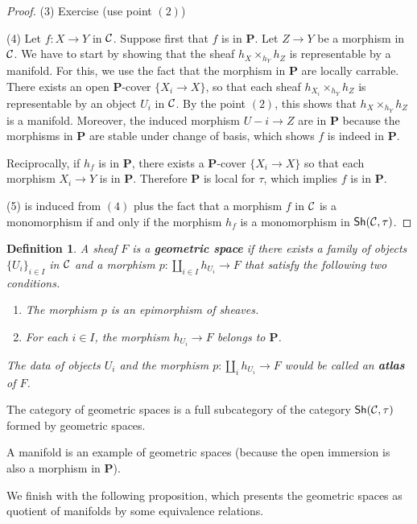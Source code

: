 \documentclass{tufte-book} %
\numberwithin{dummy}{section}
\newtheorem{dfn}[thm]{Definition}
\newcommand{\calc}{{\cal C}}
\newcommand{\lrta}{\longrightarrow}
\newcommand{\ssh}{\mathsf{Sh}}
\newcommand{\bfp}{\mathbf{P}}
\begin{document}
\begin{proof}
(3) Exercise (use point $(2)$)

(4) Let $f:X\lrta Y$ in $\calc$. Suppose first that $f$ is in $\bfp$. Let $Z\lrta Y$ be a morphism in $\calc$. We have to start by showing that the sheaf $h_X\times_{h_Y} h_Z$ is representable by a manifold. For this, we use the fact that the morphism in $\bfp$ are locally carrable. There exists an open $\bfp$-cover $\{X_i\lrta X\}$, so that each sheaf $h_{X_i}\times_{h_Y} h_Z$ is representable by an object $U_i$ in $\calc$. By the point $(2)$, this shows that $h_X\times_{h_Y} h_Z$ is a manifold. Moreover, the induced morphism $U-i\lrta Z$ are in $\bfp$ because the morphisms in $\bfp$ are stable under change of basis, which shows $f$ is indeed in $\bfp$.

Reciprocally, if $h_f$ is in $\bfp$, there exists a $\bfp$-cover $\{X_i\lrta X\}$ so that each morphism $X_i\lrta Y$ is in $\bfp$. Therefore $\bfp$ is local for $\tau$, which implies $f$ is in $\bfp$.

(5) is induced from $(4)$ plus the fact that a morphism $f$ in $\calc$ is a monomorphism if and only if the morphism $h_f$ is a monomorphism in $\ssh(\calc,\tau)$.
\end{proof}

\begin{dfn}
A sheaf $F$ is a \textbf{geometric space} if there exists a family of objects $\{U_i\}_{i\in I}$ in $\calc$ and a morphism $p:\coprod_{i\in I}h_{U_i}\lrta F$ that satisfy the following two conditions.
\begin{enumerate}
\item The morphism $p$ is an epimorphism of sheaves.
\item For each $i\in I$, the morphism $h_{U_i}\lrta F$ belongs to $\bfp$. 
\end{enumerate}
The data of objects $U_i$ and the morphism $p:\coprod_i h_{U_i}\lrta F$ would be called an \textbf{atlas} of $F$.
\end{dfn}
The category of geometric spaces is a full subcategory of the category $\ssh(\calc,\tau)$ formed by geometric spaces.

A manifold is an example of geometric spaces (because the open immersion is also a morphism in $\bfp$).

We finish with the following proposition, which presents the geometric spaces as quotient of manifolds by some equivalence relations.
\end{document}
